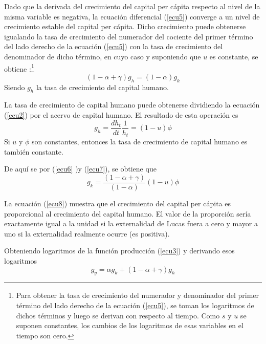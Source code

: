 \documentclass[12pt,notitlepage]{report}
\begin{document}
	Dado que la derivada del crecimiento del capital per cápita respecto al nivel de la misma variable es negativa, la ecuación diferencial (\ref{ecu5}) converge a un nivel de crecimiento estable  del capital per cápita. Dicho crecimiento puede obtenerse igualando la tasa de crecimiento del numerador del cociente del primer término del lado derecho de la ecuación (\ref{ecu5}) con la tasa de crecimiento del denominador de dicho término, en cuyo caso y suponiendo que $u$ es constante, se obtiene :\footnote{Para obtener la tasa de crecimiento del numerador y denominador del primer término del lado derecho de la ecuación (\ref{ecu5}), se toman los logaritmos de dichos términos y luego se derivan con respecto al tiempo. Como $s$ y $u$ se suponen constantes, los cambios de los logaritmos de esas variables en el tiempo son cero.}
	\begin{equation}\label{ecu6}
		(1-\alpha + \gamma)g_h=(1-\alpha)g_k
	\end{equation}
	Siendo $g_h$ la tasa de crecimiento del capital humano.
	
	La tasa de crecimiento de capital humano puede obtenerse dividiendo la ecuación (\ref{ecu2}) por el acervo de capital humano. El resultado de esta operación es
	\begin{equation}\label{ecu7}
		g_h=\frac{dh_t}{dt}\frac{1}{h_t}=(1-u)\phi
	\end{equation}
	Si $u$ y $\phi$ son constantes, entonces la tasa de crecimiento de capital humano es también constante.
	
	De aquí se por (\ref{ecu6} )y (\ref{ecu7}), se obtiene que
	\begin{equation}\label{ecu8}
		g_k=\frac{(1-\alpha +\gamma)}{(1-\alpha)}(1-u)\phi
	\end{equation}
	
	La ecuación (\ref{ecu8}) muestra que el crecimiento del capital per cápita es proporcional al crecimiento del capital humano. El valor de la proporción sería exactamente igual a la unidad si la externalidad de Lucas fuera a cero y mayor a uno si la externalidad realmente ocurre (es positiva).
	
	Obteniendo logaritmos de la función producción (\ref{ecu3}) y derivando esos logaritmos 
	\begin{equation}\label{ecu9}
		g_y=\alpha g_k + (1-\alpha +\gamma)g_h
	\end{equation}
	
\end{document}
